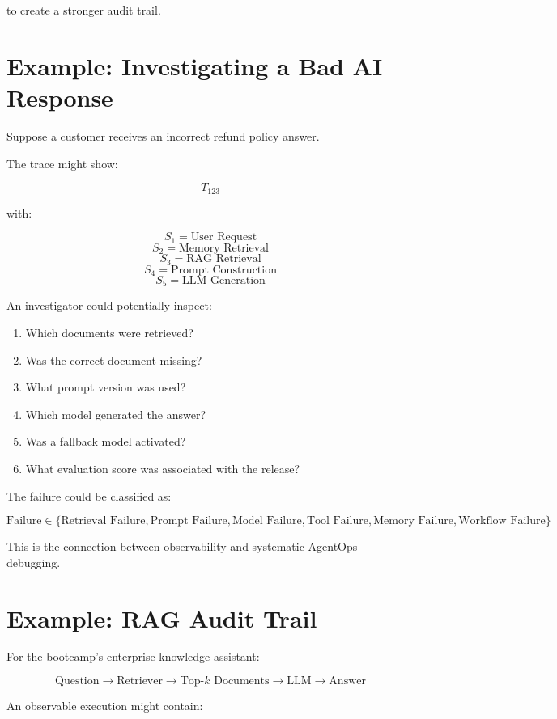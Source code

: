 \documentclass[11pt,a4paper]{article}
\begin{document}
to create a stronger audit trail.

\section{Example: Investigating a Bad AI Response}

Suppose a customer receives an incorrect refund policy answer.

The trace might show:

\[
T_{123}
\]

with:

\[
S_1 = \text{User Request}
\]
\[
S_2 = \text{Memory Retrieval}
\]
\[
S_3 = \text{RAG Retrieval}
\]
\[
S_4 = \text{Prompt Construction}
\]
\[
S_5 = \text{LLM Generation}
\]

An investigator could potentially inspect:

\begin{enumerate}
\item Which documents were retrieved?
\item Was the correct document missing?
\item What prompt version was used?
\item Which model generated the answer?
\item Was a fallback model activated?
\item What evaluation score was associated with the release?
\end{enumerate}

The failure could be classified as:

\[
\text{Failure} \in \{ \text{Retrieval Failure}, \text{Prompt Failure}, \text{Model Failure}, \text{Tool Failure}, \text{Memory Failure}, \text{Workflow Failure} \}
\]

This is the connection between observability and systematic AgentOps debugging.

\section{Example: RAG Audit Trail}

For the bootcamp's enterprise knowledge assistant:

\[
\text{Question} \rightarrow \text{Retriever} \rightarrow \text{Top-}k\text{ Documents} \rightarrow \text{LLM} \rightarrow \text{Answer}
\]

An observable execution might contain:
\end{document}
